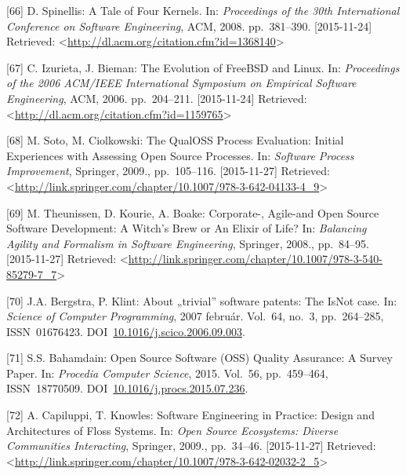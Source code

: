 \documentclass[12pt,magyar,a4paper,oneside]{scrreprt}
\newenvironment{cslreferences}%
  {}%
  {\par}
\begin{document}
\begin{cslreferences}
\leavevmode\hypertarget{ref-spinellis_tale_2008}{}%
{[}66{]} D. Spinellis: A Tale of Four Kernels. In: \emph{Proceedings of
the 30th International Conference on Software Engineering}, ACM, 2008.
pp.~381--390. {[}2015-11-24{]} Retrieved:
\textless{}\url{http://dl.acm.org/citation.cfm?id=1368140}\textgreater{}

\leavevmode\hypertarget{ref-izurieta_evolution_2006}{}%
{[}67{]} C. Izurieta, J. Bieman: The Evolution of FreeBSD and Linux. In:
\emph{Proceedings of the 2006 ACM/IEEE International Symposium on
Empirical Software Engineering}, ACM, 2006. pp.~204--211.
{[}2015-11-24{]} Retrieved:
\textless{}\url{http://dl.acm.org/citation.cfm?id=1159765}\textgreater{}

\leavevmode\hypertarget{ref-soto_qualoss_2009}{}%
{[}68{]} M. Soto, M. Ciolkowski: The QualOSS Process Evaluation: Initial
Experiences with Assessing Open Source Processes. In: \emph{Software
Process Improvement}, Springer, 2009., pp.~105--116. {[}2015-11-27{]}
Retrieved:
\textless{}\url{http://link.springer.com/chapter/10.1007/978-3-642-04133-4_9}\textgreater{}

\leavevmode\hypertarget{ref-theunissen_corporate-_2008}{}%
{[}69{]} M. Theunissen, D. Kourie, A. Boake: Corporate-, Agile-and Open
Source Software Development: A Witch's Brew or An Elixir of Life? In:
\emph{Balancing Agility and Formalism in Software Engineering},
Springer, 2008., pp.~84--95. {[}2015-11-27{]} Retrieved:
\textless{}\url{http://link.springer.com/chapter/10.1007/978-3-540-85279-7_7}\textgreater{}

\leavevmode\hypertarget{ref-bergstra_about_2007}{}%
{[}70{]} J.A. Bergstra, P. Klint: About „trivial'' software patents: The
IsNot case. In: \emph{Science of Computer Programming}, 2007 február.
Vol.~64, no.~3, pp.~264--285, ISSN~01676423.
DOI~\href{https://doi.org/10.1016/j.scico.2006.09.003}{10.1016/j.scico.2006.09.003}.

\leavevmode\hypertarget{ref-bahamdain_open_2015}{}%
{[}71{]} S.S. Bahamdain: Open Source Software (OSS) Quality Assurance: A
Survey Paper. In: \emph{Procedia Computer Science}, 2015. Vol.~56,
pp.~459--464, ISSN~18770509.
DOI~\href{https://doi.org/10.1016/j.procs.2015.07.236}{10.1016/j.procs.2015.07.236}.

\leavevmode\hypertarget{ref-capiluppi_software_2009}{}%
{[}72{]} A. Capiluppi, T. Knowles: Software Engineering in Practice:
Design and Architectures of Floss Systems. In: \emph{Open Source
Ecosystems: Diverse Communities Interacting}, Springer, 2009.,
pp.~34--46. {[}2015-11-27{]} Retrieved:
\textless{}\url{http://link.springer.com/chapter/10.1007/978-3-642-02032-2_5}\textgreater{}


\end{cslreferences}
\end{document}
